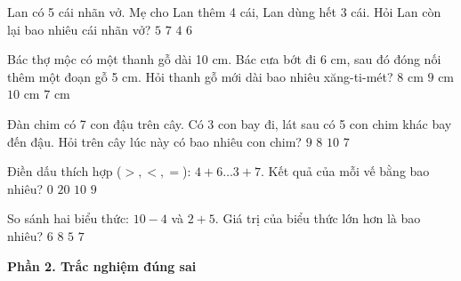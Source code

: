 \begin{ex} %
Lan có 5 cái nhãn vở. Mẹ cho Lan thêm 4 cái, Lan dùng hết 3 cái. Hỏi Lan còn lại bao nhiêu cái nhãn vở?
\choice
{$5$}
{$7$}
{$4$}
{\True $6$}
\end{ex}

\begin{ex} %
Bác thợ mộc có một thanh gỗ dài 10 cm. Bác cưa bớt đi 6 cm, sau đó đóng nối thêm một đoạn gỗ 5 cm. Hỏi thanh gỗ mới dài bao nhiêu xăng-ti-mét?
\choice
{$8\text{ cm}$}
{\True $9\text{ cm}$}
{$10\text{ cm}$}
{$7\text{ cm}$}
\end{ex}

\begin{ex} %
Đàn chim có 7 con đậu trên cây. Có 3 con bay đi, lát sau có 5 con chim khác bay đến đậu. Hỏi trên cây lúc này có bao nhiêu con chim?
\choice
{\True $9$}
{$8$}
{$10$}
{$7$}
\end{ex}

\begin{ex} %
Điền dấu thích hợp ($>, <, =$): $4 + 6 \dots 3 + 7$. Kết quả của mỗi vế bằng bao nhiêu?
\choice
{$0$}
{$20$}
{\True $10$}
{$9$}
\end{ex}

\begin{ex} %
So sánh hai biểu thức: $10 - 4$ và $2 + 5$. Giá trị của biểu thức lớn hơn là bao nhiêu?
\choice
{$6$}
{$8$}
{$5$}
{\True $7$}
\end{ex}

\textbf{Phần 2. Trắc nghiệm đúng sai}

